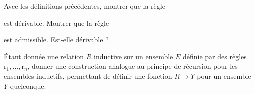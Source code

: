 \begin{exercise}
  Avec les définitions précédentes, montrer que la règle
  \begin{prooftree}
  \end{prooftree}
  est dérivable. Montrer que la règle
  \begin{prooftree}
  \end{prooftree}
  est admissible. Est-elle dérivable ?
\end{exercise}

\begin{exercise}
  \'Etant donnée une relation $R$ inductive sur un ensemble $E$ définie par
  des règles $\mathrm r_1,\ldots,\mathrm r_n$, donner une construction analogue
  au principe de récursion pour les ensembles inductifs, permettant de définir
  une fonction $R \to Y$ pour un ensemble $Y$ quelconque.
\end{exercise}
